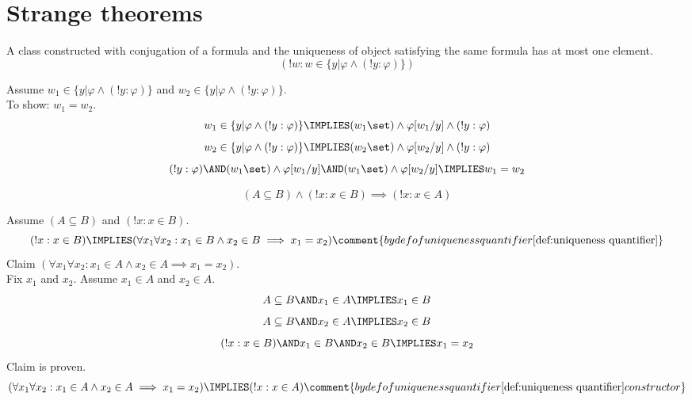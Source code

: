 \def\topic{}

\section{Strange theorems}
\begin{theorem}
A class constructed with conjugation of a formula and the uniqueness of object satisfying the same formula has at most one element.
\label{thm:class with at most one object}
\[
(!w:w\in \{y|\varphi\land (!y:\varphi)\})
\]
\end{theorem}
\Proof
Assume $w_1\in \{y|\varphi\land (!y:\varphi)\}$ and $w_2\in \{y|\varphi\land (!y:\varphi)\}$.\\
To show: $w_1=w_2$.
\[
w_1\in \{y|\varphi\land (!y:\varphi)\}
\IMPLIES
(w_1\set)
\land
\varphi[w_1/y]
\land
(!y:\varphi)
\]
\[
w_2\in \{y|\varphi\land (!y:\varphi)\}
\IMPLIES
(w_2\set)
\land
\varphi[w_2/y]
\land
(!y:\varphi)
\]
\[
(!y:\varphi)
\AND
(w_1\set)\land\varphi[w_1/y]
\AND
(w_1\set)\land\varphi[w_2/y]
\IMPLIES
w_1=w_2
\]
\Done

\begin{theorem}
\[
(A\subseteq B)\land(!x:x\in B)\implies (!x:x\in A)
\]
\end{theorem}
\Proof
Assume $(A\subseteq B)$ and $(!x:x\in B)$.
\[
(!x:x\in B)
\IMPLIES
(\forall x_1\forall x_2: x_1\in B \land x_2\in B \implies x_1=x_2)
\comment{by def of uniqueness quantifier \ref{def:uniqueness quantifier}}
\]
Claim $(\forall x_1\forall x_2: x_1\in A \land x_2\in A \implies x_1=x_2)$.\\
Fix $x_1$ and $x_2$.
Assume $x_1\in A$ and $x_2\in A$. 
\[
A\subseteq B
\AND
x_1\in A
\IMPLIES
x_1\in B
\]
\[
A\subseteq B
\AND
x_2\in A
\IMPLIES
x_2\in B
\]
\[
(!x:x\in B)
\AND
x_1\in B
\AND
x_2\in B
\IMPLIES
x_1=x_2
\]
Claim is proven.
\[
(\forall x_1\forall x_2: x_1\in A \land x_2\in A \implies x_1=x_2)
\IMPLIES
(!x:x\in A)
\comment{by def of uniqueness quantifier \ref{def:uniqueness quantifier} constructor}
\]
\Done

